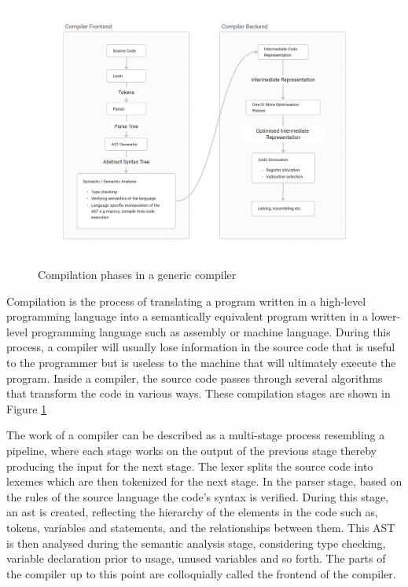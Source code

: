 \begin{figure}[t]
\includegraphics[width=\linewidth]{images/generic_compiler.png}
\centering
\caption{Compilation phases in a generic compiler}
\label{fig:compiler}
\end{figure}

Compilation is the process of translating a program written in a high-level
programming language into a semantically equivalent program written in a
lower-level programming language such as assembly or machine language. During
this process, a compiler will usually lose information in the source code that
is useful to the programmer but is useless to the machine that will ultimately
execute the program. Inside a compiler, the source code passes through several
algorithms that transform the code in various ways. These compilation stages are
shown in Figure \ref{fig:compiler}

The work of a compiler can be described as a multi-stage process resembling a
pipeline, where each stage works on the output of the previous stage thereby
producing the input for the next stage. The lexer splits the source code into
lexemes which are then tokenized for the next stage. In the parser stage, based
on the rules of the source language the code’s syntax is verified. During this
stage, an \gls{ast} is created, reflecting the hierarchy of the elements in the
code such as, tokens, variables and statements, and the relationships between
them. This AST is then analysed during the semantic analysis stage, considering
type checking, variable declaration prior to usage, unused variables and so
forth. The parts of the compiler up to this point are colloquially called the
frontend of the compiler.

